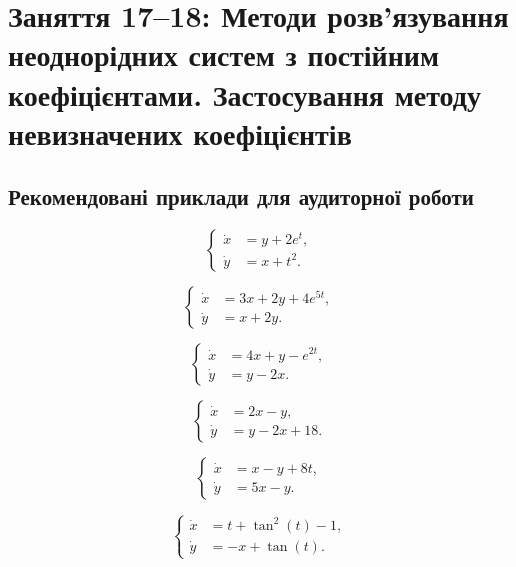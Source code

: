 \section*{Заняття 17--18: Методи розв'язування неоднорідних систем з постійним коефіцієнтами. Застосування методу невизначених коефіцієнтів}

\subsection*{Рекомендовані приклади для аудиторної роботи}

\begin{problem}
	\[ \left\{ \begin{aligned} \dot x &= y + 2 e^t, \\ \dot y &= x + t^2. \end{aligned} \right. \]
\end{problem}

\begin{problem}
	\[ \left\{ \begin{aligned} \dot x &= 3 x + 2 y + 4 e^{5 t}, \\ \dot y &= x + 2 y. \end{aligned} \right. \]
\end{problem}

\begin{problem}
	\[ \left\{ \begin{aligned} \dot x &= 4 x + y - e^{2 t}, \\ \dot y &= y - 2 x. \end{aligned} \right. \]
\end{problem}

\begin{problem}
	\[ \left\{ \begin{aligned} \dot x &= 2 x - y, \\ \dot y &= y - 2 x + 18. \end{aligned} \right. \]
\end{problem}

\begin{problem}
	\[ \left\{ \begin{aligned} \dot x &= x - y + 8 t, \\ \dot y &= 5 x - y. \end{aligned} \right. \]
\end{problem}

\begin{problem}
	\[ \left\{ \begin{aligned} \dot x &= t + \tan^2 (t) - 1, \\ \dot y &= - x + \tan (t). \end{aligned} \right. \]
\end{problem}

